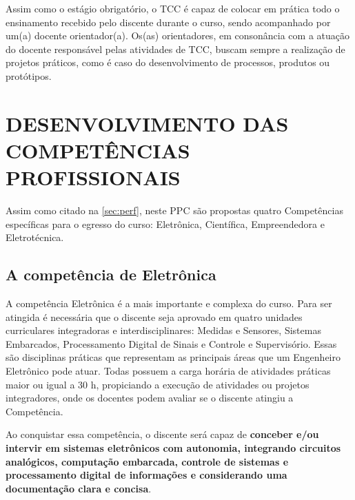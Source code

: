 Assim como o estágio obrigatório, o TCC é capaz de colocar em prática todo o ensinamento recebido pelo discente durante o curso, sendo acompanhado por um(a) docente orientador(a). Os(as) orientadores, em consonância com a atuação do docente responsável pelas atividades de TCC, buscam sempre a realização de projetos práticos, como é caso do desenvolvimento de processos, produtos ou protótipos.

\section{DESENVOLVIMENTO DAS COMPETÊNCIAS PROFISSIONAIS}
\label{sec:comp}

Assim como citado na \autoref{sec:perf}, neste PPC são propostas quatro Competências específicas para o egresso do curso: Eletrônica, Científica, Empreendedora e Eletrotécnica.

\subsection{A competência de Eletrônica}

A competência Eletrônica é a mais importante e complexa do curso. Para ser atingida é necessária que o discente seja aprovado em quatro unidades curriculares integradoras e interdisciplinares: Medidas e Sensores, Sistemas Embarcados, Processamento Digital de Sinais e Controle e Supervisório. Essas são disciplinas práticas que representam as principais áreas que um Engenheiro Eletrônico pode atuar. Todas possuem a carga horária de atividades práticas maior ou igual a 30 h, propiciando a execução de atividades ou projetos integradores, onde os docentes podem avaliar se o discente atingiu a Competência.

Ao conquistar essa competência, o discente será capaz de \textbf{conceber e/ou intervir em sistemas eletrônicos com autonomia, integrando circuitos analógicos, computação embarcada, controle de sistemas e processamento digital de informações e considerando uma documentação clara e concisa}.


